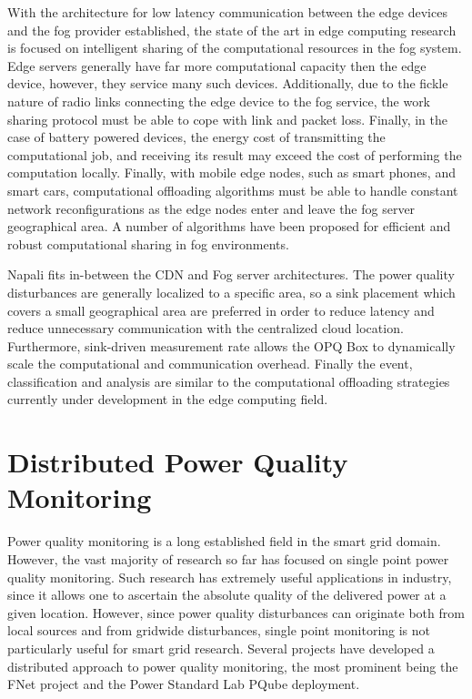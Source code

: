 With the architecture for low latency communication between the edge devices and the fog provider established, the state of the art in edge computing research is focused on intelligent sharing of the computational resources in the fog system.
Edge servers generally have far more computational capacity then the edge device, however, they service many such devices.
Additionally, due to the fickle nature of radio links connecting the edge device to the fog service, the work sharing protocol must be able to cope with link and packet loss.
Finally, in the case of battery powered devices, the energy cost of transmitting the computational job, and receiving its result may exceed the cost of performing the computation locally.
Finally, with mobile edge nodes, such as smart phones, and smart cars, computational offloading algorithms must be able to handle constant network reconfigurations as the edge nodes enter and leave the fog server geographical area.
A number of algorithms have been proposed for efficient and robust computational sharing in fog environments. \cite{oueis2015fog} \cite{wang2015mobiscud} \cite{wang2013mobile}

Napali fits in-between the CDN and Fog server architectures.
The power quality disturbances are generally localized to a specific area, so a sink placement which covers a small geographical area are preferred in order to reduce latency and reduce unnecessary communication with the centralized cloud location.
Furthermore, sink-driven measurement rate allows the OPQ Box to dynamically scale the computational and communication overhead.
Finally the event, classification and analysis are similar to the computational offloading strategies currently under development in the edge computing field.

\section{Distributed Power Quality Monitoring}\label{sec:distributed-power-quality-monitoring}

Power quality monitoring is a long established field in the smart grid domain.
However, the vast majority of research so far has focused on single point power quality monitoring.\cite{silva2017development} Such research has extremely useful applications in industry, since it allows one to ascertain the absolute quality of the delivered power at a given location.
However, since power quality disturbances can originate both from local sources and from gridwide disturbances, single point monitoring is not particularly useful for smart grid research.
Several projects have developed a distributed approach to power quality monitoring, the most prominent being the FNet project and the Power Standard Lab PQube deployment.


